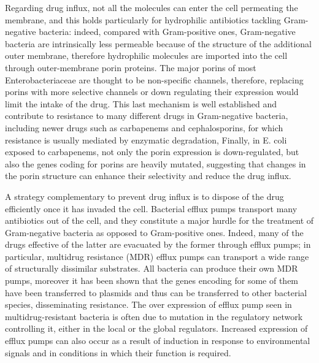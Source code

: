 \documentclass[a4paper,11pt]{extreport}
\begin{document}
Regarding drug influx, not all the molecules can enter the cell permeating the membrane, and this holds particularly for hydrophilic antibiotics tackling Gram-negative bacteria: indeed, compared with Gram-positive ones, Gram-negative bacteria are intrinsically less permeable because of the structure of the additional outer membrane,\cite{Delcour2009} therefore hydrophilic molecules are imported into the cell through outer-membrane porin proteins.\cite{Vargiu2012,Kojima2013}
%
The major porins of most Enterobacteriaceae are thought to be non-specific channels,\cite{Tran2013} therefore, replacing porins with more selective channels or down regulating their expression would limit the intake of the drug. This last mechanism is well established and contribute to resistance to many different drugs in Gram-negative bacteria, including newer drugs such as carbapenems and cephalosporins, for which resistance is usually mediated by enzymatic degradation,\cite{Tamber2003,Baroud2013,Lavigne2013,Poulou2013,Wozniak2012}
Finally, in E. coli exposed to carbapenems, not only the porin expression is down-regulated, but also the genes coding for porins are heavily mutated, suggesting that changes in the porin structure can enhance their selectivity and reduce the drug influx.\cite{Lavigne2013,Novais2012,Tangden2013}

A strategy complementary to prevent drug influx is to dispose of the drug efficiently once it has invaded the cell. Bacterial efflux pumps transport many antibiotics out of the cell, and they constitute a major hurdle for the treatment of Gram-negative bacteria as opposed to Gram-positive ones. Indeed, many of the drugs effective of the latter are evacuated by the former through efflux pumps; in particular, multidrug resistance (MDR) efflux pumps can transport a wide range of structurally dissimilar substrates.
%
All bacteria can produce their own MDR pumps,\cite{Floyd2010,Hu2012,Kim2013,Ogawa2012} moreover it has been shown that the genes encoding for some of them have been transferred to plasmids and thus can be transferred to other bacterial species, disseminating resistance.\cite{Dolejska2013}
%
The over expression of efflux pump seen in multidrug-resistant bacteria is often due to mutation in the regulatory network controlling it, either in the local or the global regulators.\cite{Abouzeed2008}
%
Increased expression of efflux pumps can also occur as a result of induction in response to environmental signals and in conditions in which their function is required.\cite{Baucheron2014,Nikaido2011,Hirakawa2004}
\end{document}
